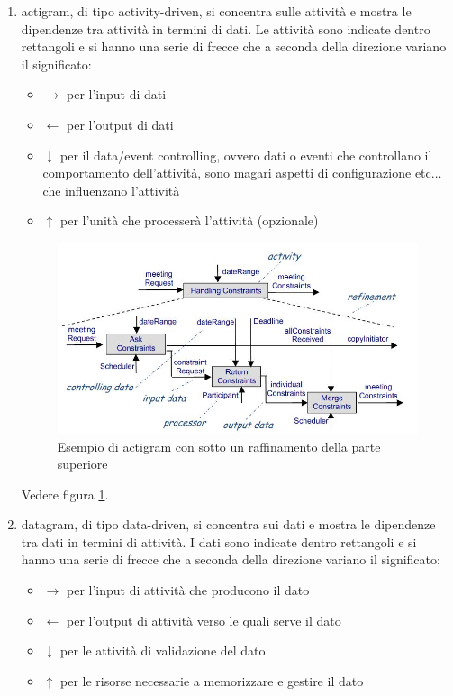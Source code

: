 \documentclass[a4paper,12pt, oneside]{book}
\begin{document}
\begin{enumerate}
  \item actigram, di tipo activity-driven, si concentra sulle attività e mostra
  le dipendenze tra attività in termini di dati. Le attività sono indicate
  dentro rettangoli e si hanno una serie di frecce che a seconda della direzione
  variano il significato:
  \begin{itemize}
    \item $\longrightarrow$ per l'input di dati
    \item $\longleftarrow$ per l'output di dati
    \item $\downarrow$ per il data/event controlling, ovvero dati o eventi che
    controllano il comportamento dell'attività, sono magari aspetti di
    configurazione etc$\ldots$ che influenzano l'attività
    \item $\uparrow$ per l'unità che processerà l'attività (opzionale)
  \end{itemize}
  \begin{figure}
    \centering
    \includegraphics[scale = 0.5]{img/agram.jpg}
    \caption{Esempio di actigram con sotto un raffinamento della parte
      superiore} 
    \label{fig:agram}
  \end{figure}
  Vedere figura \ref{fig:agram}.
  \item datagram, di tipo data-driven, si concentra sui dati e mostra
  le dipendenze tra dati in termini di attività. I dati sono indicate
  dentro rettangoli e si hanno una serie di frecce che a seconda della direzione
  variano il significato:
  \begin{itemize}
    \item $\longrightarrow$ per l'input di attività che producono il dato
    \item $\longleftarrow$ per l'output di attività verso le quali serve il dato
    \item $\downarrow$ per le attività di validazione del dato
    \item $\uparrow$ per le risorse necessarie a memorizzare e gestire il dato
  \end{itemize}
  

\end{enumerate}
\end{document}
